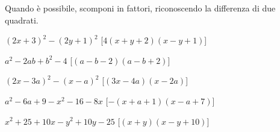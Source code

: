 
\begin{esercizio}[\Ast]
\label{ese:div.019}
Quando è possibile, scomponi in fattori, riconoscendo la differenza di due 
quadrati.
\begin{enumeratea}
 \item $(2x+3)^{2}-(2y+1)^{2}$ \hfill [$4(x+y+2)(x-y+1)$]
 \item $a^{2}-2{ab}+b^{2}-4$ \hfill [$(a-b-2)(a-b+2)$]
 \item $(2x-3a)^{2}-(x-a)^{2}$ \hfill [$(3x-4a)(x-2a)$]
 \item $a^{2}-6a+9-x^{2}-16-8x$ \hfill [$-(x+a+1)(x-a+7)$]
 \item $x^{2}+25+10x-y^{2}+10y-25$ \hfill [$(x+y)(x-y+10)$]
\end{enumeratea}
\end{esercizio}

